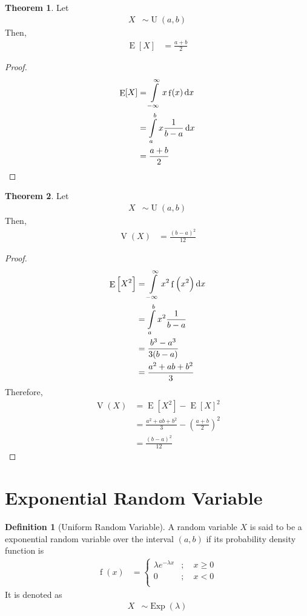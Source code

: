 \documentclass[titlepage, fleqn, a4paper, 12pt, twoside]{article}
\theoremstyle{definition}
\newtheorem{definition}{Definition}
\theoremstyle{theorem}
\newtheorem{theorem}{Theorem}
\DeclareMathOperator{\expct}{\mathrm{E}}
\DeclareMathOperator{\var}{\mathrm{V}}
\DeclareMathOperator{\pdf}{\mathrm{f}}
\DeclareMathOperator{\uniform}{\mathrm{U}}
\DeclareMathOperator{\exponential}{\mathrm{Exp}}
\begin{document}
\begin{theorem}
	Let
	\begin{align*}
		X &\sim \uniform(a,b)
	\end{align*}
	Then,
	\begin{align*}
		\expct[X] &= \frac{a + b}{2}
	\end{align*}
\end{theorem}

\begin{proof}
	\begin{align*}
		\expct[X] &= \int\limits_{-\infty}^{\infty} x \pdf(x) \dif x\\
		&= \int\limits_{a}^{b} x \frac{1}{b - a} \dif x\\
		&= \frac{a + b}{2}
	\end{align*}
\end{proof}

\begin{theorem}
	Let
	\begin{align*}
		X &\sim \uniform(a,b)
	\end{align*}
	Then,
	\begin{align*}
		\var(X) &= \frac{(b - a)^2}{12}
	\end{align*}
\end{theorem}

\begin{proof}
	\begin{align*}
		\expct\left[ X^2 \right] &= \int\limits_{-\infty}^{\infty} x^2 \pdf\left( x^2 \right) \dif x\\
		&= \int\limits_{a}^{b} x^2 \frac{1}{b - a}\\
		&= \frac{b^3 - a^3}{3 (b - a)}\\
		&= \frac{a^2 + a b + b^2}{3}
	\end{align*}
	Therefore,
	\begin{align*}
		\var(X) &= \expct\left[ X^2 \right] - \expct[X]^2\\
		&= \frac{a^2 + a b + b^2}{3} - \left( \frac{a + b}{2} \right)^2\\
		&= \frac{(b - a)^2}{12}
	\end{align*}
\end{proof}

\section{Exponential Random Variable}

\begin{definition}[Uniform Random Variable]
	A random variable $X$ is said to be a exponential random variable over the interval $(a,b)$ if its probability density function is
	\begin{align*}
		\pdf(x) &=
			\begin{cases}
				\lambda e^{-\lambda x} &;\quad x \ge 0\\
				0 &;\quad x < 0\\
			\end{cases}
	\end{align*}
	It is denoted as
	\begin{align*}
		X &\sim \exponential(\lambda)
	\end{align*}
\end{definition}
\end{document}
